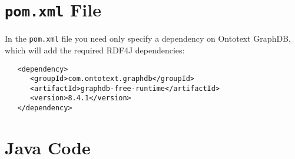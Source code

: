 \documentclass{amsart}
\begin{document}
  
  \section{\texttt{pom.xml} File}
  In the \texttt{pom.xml} file you need only specify a dependency on Ontotext GraphDB, which will add the required RDF4J dependencies:
  \begin{small}
  \begin{verbatim}
   <dependency>
      <groupId>com.ontotext.graphdb</groupId>
      <artifactId>graphdb-free-runtime</artifactId>
      <version>8.4.1</version>
   </dependency>    
  \end{verbatim}
  \end{small}

  
  \section{Java Code}
\end{document}
